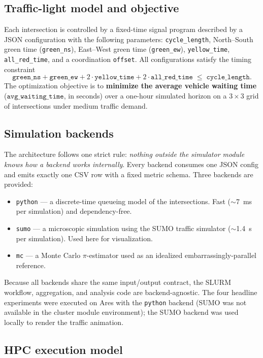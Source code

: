 \documentclass[11pt,a4paper]{article}
\begin{document}
\subsection{Traffic-light model and objective}

Each intersection is controlled by a fixed-time signal program described by a JSON
configuration with the following parameters: \texttt{cycle\_length}, North--South
green time (\texttt{green\_ns}), East--West green time (\texttt{green\_ew}),
\texttt{yellow\_time}, \texttt{all\_red\_time}, and a coordination \texttt{offset}.
All configurations satisfy the timing constraint
\[
\texttt{green\_ns} + \texttt{green\_ew} + 2\cdot\texttt{yellow\_time}
+ 2\cdot\texttt{all\_red\_time} \;\leq\; \texttt{cycle\_length}.
\]
The optimization objective is to \textbf{minimize the average vehicle waiting time}
($\texttt{avg\_waiting\_time}$, in seconds) over a one-hour simulated horizon on a
$3\times3$ grid of intersections under medium traffic demand.

\subsection{Simulation backends}

The architecture follows one strict rule: \emph{nothing outside the simulator
module knows how a backend works internally}. Every backend consumes one JSON
config and emits exactly one CSV row with a fixed metric schema. Three backends
are provided:
\begin{itemize}
  \item \texttt{python} --- a discrete-time queueing model of the intersections.
        Fast ($\sim$\SI{7}{\milli\second} per simulation) and dependency-free.
  \item \texttt{sumo} --- a microscopic simulation using the SUMO traffic
        simulator ($\sim$\SI{1.4}{\second} per simulation). Used here for
        visualization.
  \item \texttt{mc} --- a Monte Carlo $\pi$-estimator used as an idealized
        embarrassingly-parallel reference.
\end{itemize}
Because all backends share the same input/output contract, the SLURM workflow,
aggregation, and analysis code are backend-agnostic. The four headline
experiments were executed on Ares with the \texttt{python} backend (SUMO was not
available in the cluster module environment); the SUMO backend was used locally
to render the traffic animation.

\subsection{HPC execution model}
\end{document}
